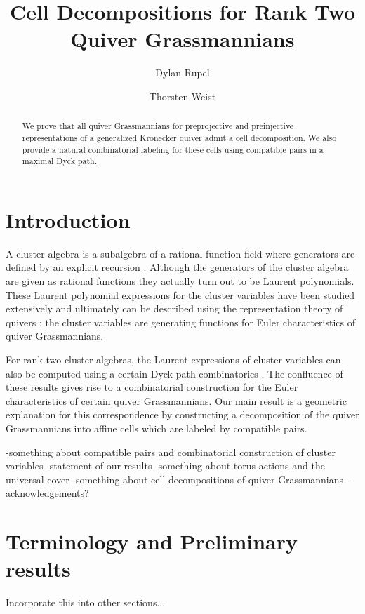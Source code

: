 \documentclass{amsart}
\title{Cell Decompositions for Rank Two Quiver Grassmannians}
\author{Dylan Rupel}
\author{Thorsten Weist}
\begin{document}
\begin{abstract}
  We prove that all quiver Grassmannians for preprojective and preinjective representations of a generalized Kronecker quiver admit a cell decomposition.  
  We also provide a natural combinatorial labeling for these cells using compatible pairs in a maximal Dyck path. 
\end{abstract}
\maketitle

\section{Introduction}
A cluster algebra is a subalgebra of a rational function field where generators are defined by an explicit recursion \cite{fomin-zelevinsky}.
Although the generators of the cluster algebra are given as rational functions they actually turn out to be Laurent polynomials.
These Laurent polynomial expressions for the cluster variables have been studied extensively and ultimately can be described using the representation theory of quivers \cite{caldero-chapoton,caldero-keller}: the cluster variables are generating functions for Euler characteristics of quiver Grassmannians.

For rank two cluster algebras, the Laurent expressions of cluster variables can also be computed using a certain Dyck path combinatorics \cite{lee-li-zelevinsky}.
The confluence of these results gives rise to a combinatorial construction for the Euler characteristics of certain quiver Grassmannians.
Our main result is a geometric explanation for this correspondence by constructing a decomposition of the quiver Grassmannians into affine cells which are labeled by compatible pairs.

-something about compatible pairs and combinatorial construction of cluster variables
-statement of our results
-something about torus actions and the universal cover
-something about cell decompositions of quiver Grassmannians
-acknowledgements?


\section{Terminology and Preliminary results}

Incorporate this into other sections...
\end{document}
